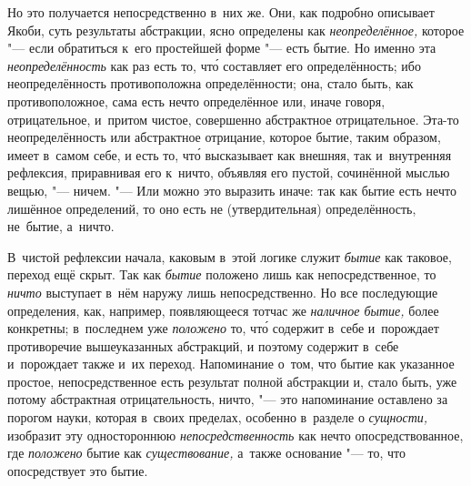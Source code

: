 Но это получается непосредственно в~них же. Они, как подробно описывает Якоби,
суть результаты абстракции, ясно определены как {\em неопределённое,} которое
"--- если обратиться к~его простейшей форме "--- есть бытие. Но именно эта
{\em неопределённость} как раз есть то, чт\'{о} составляет его определённость;
ибо неопределённость противоположна определённости; она, стало быть, как
противоположное, сама есть нечто определённое или, иначе говоря, отрицательное,
и~притом чистое, совершенно абстрактное отрицательное. Эта-то неопределённость
или абстрактное отрицание, которое бытие, таким образом, имеет в~самом себе, и
есть то, чт\'{о} высказывает как внешняя, так и~внутренняя рефлексия,
приравнивая его к~ничто, объявляя его пустой, сочинённой мыслью вещью,
"--- ничем. "--- Или можно это выразить иначе: так как бытие есть нечто
лишённое определений, то оно есть не (утвердительная) определённость, не~бытие,
а~ничто.

В~чистой рефлексии начала, каковым в~этой логике служит {\em бытие} как
таковое, переход ещё скрыт. Так как {\em бытие} положено лишь как
непосредственное, то {\em ничто} выступает в~нём наружу лишь непосредственно.
Но все последующие определения, как, например, появляющееся тотчас же
{\em наличное бытие,} более конкретны; в~последнем уже {\em положено} то,
чт\'{о} содержит в~себе и~порождает противоречие вышеуказанных абстракций, и
поэтому содержит в~себе и~порождает также и~их переход. Напоминание
о~том, что бытие как указанное простое, непосредственное есть
результат полной абстракции и, стало быть, уже потому абстрактная
отрицательность, ничто, "--- это напоминание оставлено за порогом науки,
которая в~своих пределах, особенно в~разделе о {\em сущности,} изобразит
эту одностороннюю {\em непосредственность} как нечто опосредствованное,
где {\em положено} бытие как {\em существование,} а~также основание "---
то, что опосредствует это бытие.

